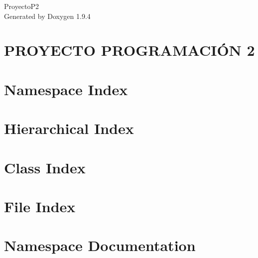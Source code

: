 \documentclass[twoside]{book}
\newcommand{\+}{\discretionary{\mbox{\scriptsize$\hookleftarrow$}}{}{}}
\newcommand{\clearemptydoublepage}{%
    \newpage{\pagestyle{empty}\cleardoublepage}%
  }
\begin{document}
  \raggedbottom
    \hypersetup{pageanchor=false,
                bookmarksnumbered=true,
                pdfencoding=unicode
               }
  \begin{titlepage}
  \vspace*{7cm}
  \begin{center}%
  {\Large Proyecto\+P2}\\
  \vspace*{1cm}
  {\large Generated by Doxygen 1.9.4}\\
  \end{center}
  \end{titlepage}
  \clearemptydoublepage
  \tableofcontents
  \clearemptydoublepage
  \hypersetup{pageanchor=true}
\chapter{PROYECTO PROGRAMACIÓN 2}
\label{md__c___users_flo__desktop_pii_2022_2_equipo_4__r_e_a_d_m_e}

\chapter{Namespace Index}

\chapter{Hierarchical Index}

\chapter{Class Index}

\chapter{File Index}

\chapter{Namespace Documentation}







\end{document}
